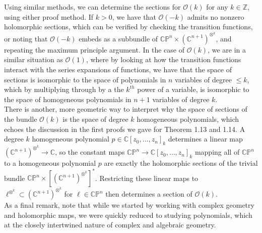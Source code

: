 \documentclass[psamsfonts, 12pt]{amsart}
\theoremstyle{definition}
\theoremstyle{remark}
\renewcommand{\O}{\mathscr{O}}
\newcommand{\Z}{\mathbb{Z}}
\newcommand{\C}{\mathbb{C}}
\newcommand{\CP}{\mathbb{CP}}
\begin{document}
%
Using similar methods, we can determine the sections for $\O(k)$ for any
$k \in \Z$, using either proof method. If $k > 0$, we have that
$\O(-k)$ admits no nonzero holomorphic sections, which can be verified by checking the
transition functions, or noting that $\O(-k)$ embeds as a subbundle of
$\CP^n \times (\C^{n+1})^{\otimes^k}$, and repeating the maximum principle argument.
In the case of $\O(k)$, we are in a similar situation as $\O(1)$, where by
looking at how the transition functions interact with the series expansions of
functions, we have that the space of sections is isomorphic to the
space of polynomials in $n$ variables of degree $\leq k$, which by multiplying through
by a the $k^{th}$ power of a variable, is isomorphic to the space of homogeneous
polynomials in $n+1$ variables of degree $k$. \\

There is another, more geometric way to interpret why the space of sections of
the bundle $\O(k)$ is the space of degree $k$ homogeneous polynomials, which
echoes the discussion in the first proofs we gave for Theorem 1.13 and 1.14.
A degree $k$ homogeneous polynomial $p \in \C[z_0,\ldots,z_n]_k$ determines
a linear map $(\C^{n+1})^{\otimes^k} \to \C$, so the
constant maps $\CP^n \to \C[z_0,\ldots,z_n]_k$ mapping all of $\CP^n$ to a
homogeneous polynomial $p$ are exactly the holomorphic sections of the
trivial bundle $\CP^n \times [(\C^{n+1})^{\otimes^k}]^*$. Restricting
these linear maps to $\ell^{\otimes^k} \subset (\C^{n+1})^{\otimes^k}$ for
$\ell \in \CP^n$ then determines a section of $\O(k)$. \\

As a final remark, note that while we started by working with complex geometry
and holomorphic maps, we were quickly reduced to studying polynomials, which
at the closely intertwined nature of complex and algebraic geometry.
%
\end{document}
